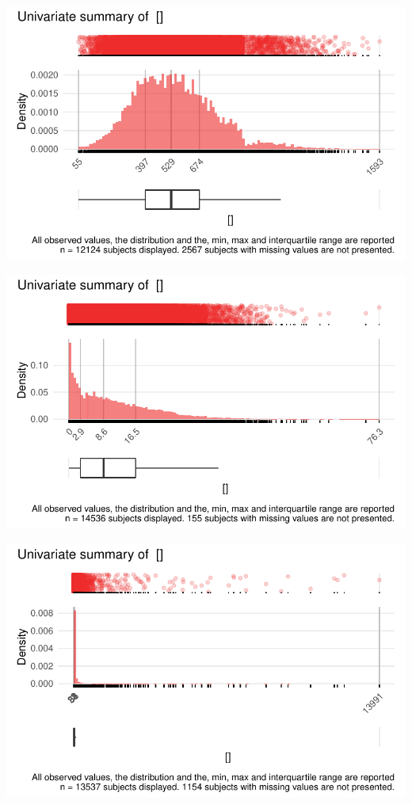 \documentclass[
  letterpaper,
  DIV=11,
  numbers=noendperiod]{scrreport}
\begin{document}
\includegraphics{./Bact_univar_files/figure-pdf/uni03-2.pdf}

\includegraphics{./Bact_univar_files/figure-pdf/uni03-3.pdf}

\includegraphics{./Bact_univar_files/figure-pdf/uni03-4.pdf}
\end{document}
